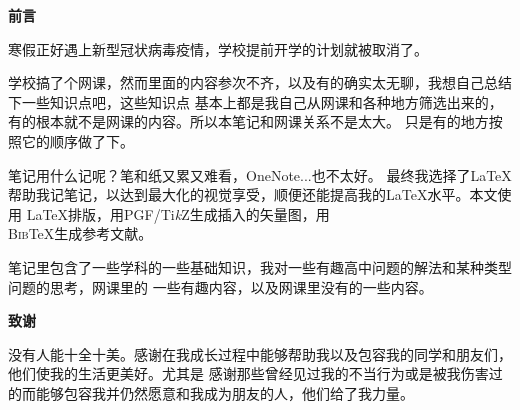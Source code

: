 \begin{center}
\begin{LARGE}
\textbf{前言}
\end{LARGE}
\end{center}

寒假正好遇上新型冠状病毒疫情，学校提前开学的计划就被取消了。

学校搞了个网课，然而里面的内容参次不齐，以及有的确实太无聊，我想自己总结下一些知识点吧，这些知识点
基本上都是我自己从网课和各种地方筛选出来的，有的根本就不是网课的内容。所以本笔记和网课关系不是太大。
只是有的地方按照它的顺序做了下。

笔记用什么记呢？笔和纸又累又难看，OneNote...也不太好。
最终我选择了\LaTeX 帮助我记笔记，以达到最大化的视觉享受，顺便还能提高我的\LaTeX 水平。本文使用
\LaTeX 排版，用PGF/Ti\emph{k}Z生成插入的矢量图，用\\
B\textsc{ib}\TeX 生成参考文献。

笔记里包含了一些学科的一些基础知识，我对一些有趣高中问题的解法和某种类型问题的思考，网课里的
一些有趣内容，以及网课里没有的一些内容。

\medskip
\begin{center}
\begin{LARGE}
\textbf{致谢}
\end{LARGE}
\end{center}
没有人能十全十美。感谢在我成长过程中能够帮助我以及包容我的同学和朋友们，他们使我的生活更美好。尤其是
感谢那些曾经见过我的不当行为或是被我伤害过的而能够包容我并仍然愿意和我成为朋友的人，他们给了我力量。